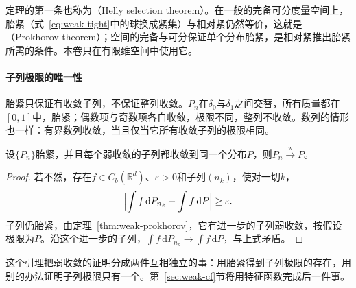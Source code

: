 定理的第一条也称为（Helly selection theorem）。在一般的完备可分度量空间上，胎紧（式~\eqref{eq:weak-tight}中的球换成紧集）与相对紧仍然等价，这就是（Prokhorov theorem）；空间的完备与可分保证单个分布胎紧，是相对紧推出胎紧所需的条件。本卷只在有限维空间中使用它。

\paragraph{子列极限的唯一性}
胎紧只保证有收敛子列，不保证整列收敛。$P_n$在$\delta_0$与$\delta_1$之间交替，所有质量都在$[0,1]$中，胎紧；偶数项与奇数项各自收敛，极限不同，整列不收敛。数列的情形也一样：有界数列收敛，当且仅当它所有收敛子列的极限相同。

\begin{lemma}[子列原则]
\label{lem:weak-subsequence}
设$\{P_n\}$胎紧，并且每个弱收敛的子列都收敛到同一个分布$P$，则$P_n\xrightarrow{\mathrm{w}}P$。
\end{lemma}

\begin{proof}
若不然，存在$f\in C_b(\mathbb{R}^{d})$、$\varepsilon>0$和子列$(n_k)$，使对一切$k$，
\[
 \Bigl\lvert\int f\,\mathrm{d}P_{n_k}-\int f\,\mathrm{d}P\Bigr\rvert\geq\varepsilon .
\]
子列仍胎紧，由定理~\ref{thm:weak-prokhorov}，它有进一步的子列弱收敛，按假设极限为$P$。沿这个进一步的子列，$\int f\,\mathrm{d}P_{n_k}\to\int f\,\mathrm{d}P$，与上式矛盾。
\end{proof}

这个引理把弱收敛的证明分成两件互相独立的事：用胎紧得到子列极限的存在，用别的办法证明子列极限只有一个。第~\ref{sec:weak-cf}节将用特征函数完成后一件事。

